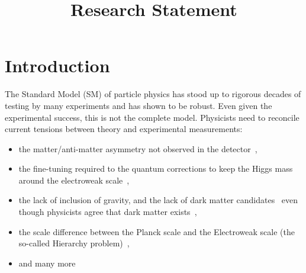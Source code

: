 \documentclass[10pt,a4paper,sans]{moderncv} %
\title{Research Statement}
\begin{document}
\renewcommand*{\bibliographyhead}[1]{\section{#1}}
\makecvtitle %
\vspace*{-4em}

\section{Introduction}

The Standard Model (SM) of particle physics has stood up to rigorous decades of testing by many experiments and has shown to be robust. Even given the experimental success, this is not the complete model. Physicists need to reconcile current tensions between theory and experimental measurements:
\\
\begin{itemize}
 \item the matter/anti-matter asymmetry not observed in the detector~\cite{canetti2012matter},
 \item the fine-tuning required to the quantum corrections to keep the Higgs mass around the electroweak scale~\cite{Baer:2013ava},
 \item the lack of inclusion of gravity, and the lack of dark matter candidates~\cite{bertone2005particle} even though physicists agree that dark matter exists~\cite{Ade:2015xua},
 \item the scale difference between the Planck scale and the Electroweak scale (the so-called Hierarchy problem)~\cite{tHooft:1980xss},
 \item and many more\\%
\end{itemize}
\end{document}

